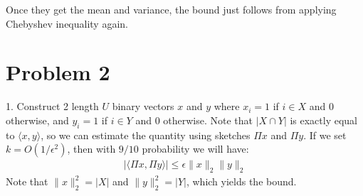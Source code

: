 \documentclass[11pt]{article}
\begin{document}
Once they get the mean and variance, the bound just follows from applying Chebyshev inequality again.

\section*{Problem 2}
	1. Construct 2 length $U$ binary vectors $x$ and $y$ where $x_i = 1$ if $i \in X$ and $0$ otherwise, and $y_i = 1$ if $i \in Y$ and $0$ otherwise. Note that $|X\cap Y|$ is exactly equal to $\langle x, y\rangle$, so we can estimate the quantity using sketches $\Pi x$ and $\Pi y$. If we set $k = O(1/\epsilon^2)$, then with $9/10$ probability we will have:
	\begin{align*}
		\left|\langle \Pi x, \Pi y \rangle \right| \leq \epsilon \|x\|_2 \|y\|_2
	\end{align*}
Note that $\|x\|_2^2 = |X|$ and $\|y\|_2^2 = |Y|$, which yields the bound. 
\end{document}
